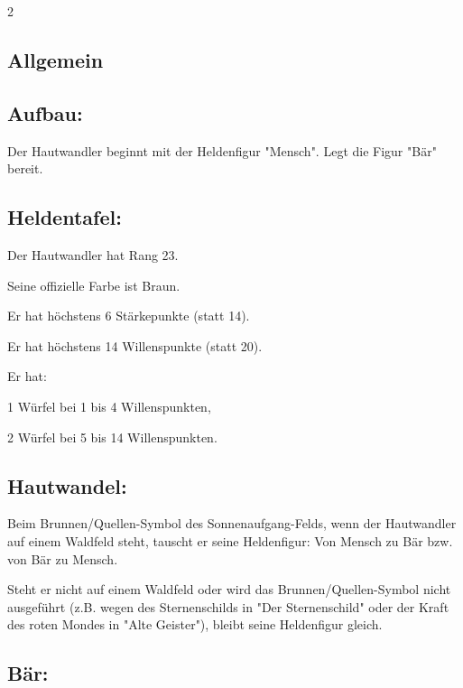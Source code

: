 \documentclass[10pt, a4paper, oneside]{book}
\begin{document}
\begin{multicols*}{2}\raggedcolumns


\begin{nobgcolor}

\section{Allgemein}

\subsection{Aufbau:}

Der Hautwandler beginnt mit der Heldenfigur "Mensch". Legt die Figur "Bär" bereit.




\subsection{Heldentafel:}

Der Hautwandler hat Rang 23.

Seine offizielle Farbe ist Braun.

Er hat höchstens 6 Stärkepunkte (statt 14).

Er hat höchstens 14 Willenspunkte (statt 20).

Er hat:

\bullet{} 1 Würfel bei 1 bis 4 Willenspunkten,

\bullet{} 2 Würfel bei 5 bis 14 Willenspunkten.




\subsection{Hautwandel:}

Beim Brunnen/Quellen-Symbol des Sonnenaufgang-Felds, wenn der Hautwandler auf einem Waldfeld steht, tauscht er seine Heldenfigur: Von Mensch zu Bär bzw. von Bär zu Mensch.
\supercite{46300}

Steht er nicht auf einem Waldfeld oder wird das Brunnen/Quellen-Symbol nicht ausgeführt (z.B. wegen des Sternenschilds in "Der Sternenschild" oder der Kraft des roten Mondes in "Alte Geister"), bleibt seine Heldenfigur gleich.



\subsection{Bär:}


\end{nobgcolor}
\end{multicols*}
\end{document}

